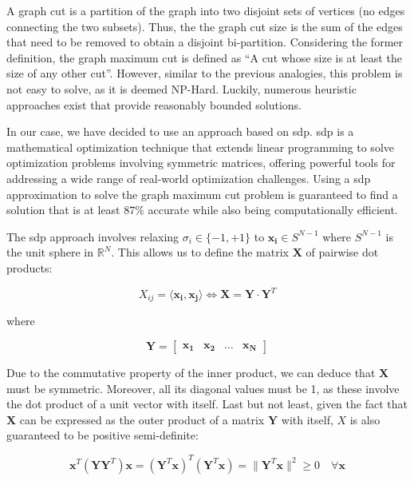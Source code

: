 \documentclass[../main.tex]{subfiles}
\begin{document}
A graph cut is a partition of the graph into two disjoint sets of vertices (no edges connecting the two subsets). Thus, the the graph cut size is the sum of the edges that need to be removed to obtain a disjoint bi-partition. Considering the former definition, the graph maximum cut is defined as ``A cut whose size is at least the size of any other cut''\cite{sudakov2005}. However, similar to the previous analogies, this problem is not easy to solve, as it is deemed NP-Hard\cite{chan2014}. Luckily, numerous heuristic approaches exist that provide reasonably bounded solutions.

In our case, we have decided to use an approach based on \gls{sdp}. \Gls{sdp} is a mathematical optimization technique that extends linear programming to solve optimization problems involving symmetric matrices, offering powerful tools for addressing a wide range of real-world optimization challenges. Using a \gls{sdp} approximation to solve the graph maximum cut problem is guaranteed to find a solution that is at least $87 \si{\percent}$ accurate while also being computationally efficient\cite{kemal2008}.

The \gls{sdp} approach involves relaxing $\sigma_i \in \{-1, +1\}$ to $\bm{x_i} \in S^{N-1}$ where $S^{N-1}$ is the unit sphere in $\mathbb{R}^N$. This allows us to define the matrix $\bm{X}$ of pairwise dot products:

\begin{equation}
    X_{ij} = \langle \bm{x_i}, \bm{x_j} \rangle \Leftrightarrow \bm{X} = \bm{Y} \cdot \bm{Y}^T
\end{equation}

where

\begin{equation}
    \bm{Y} =
    \begin{bmatrix}
        \bm{x_1} & \bm{x_2} & \dots & \bm{x_N}
    \end{bmatrix}
\end{equation}

Due to the commutative property of the inner product, we can deduce that $\bm{X}$ must be symmetric. Moreover, all its diagonal values must be 1, as these involve the dot product of a unit vector with itself. Last but not least, given the fact that $\bm{X}$ can be expressed as the outer product of a matrix $\bm{Y}$ with itself, $X$ is also guaranteed to be positive semi-definite: 

\begin{equation}
    \bm{x}^T (\bm{Y} \bm{Y}^T) \bm{x} = (\bm{Y}^T \bm{x})^T (\bm{Y}^T \bm{x}) = \lVert \bm{Y}^T \bm{x} \rVert^2 \geq 0 \quad \forall \bm{x}
\end{equation}
\end{document}
